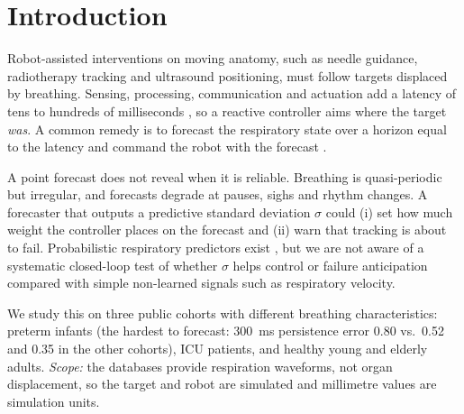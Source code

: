 \documentclass[conference]{IEEEtran}
\begin{document}
\section{Introduction}
Robot-assisted interventions on moving anatomy, such as needle guidance, radiotherapy tracking and ultrasound positioning, must follow targets displaced by breathing. Sensing, processing, communication and actuation add a latency of tens to hundreds of milliseconds \cite{rCyber}, so a reactive controller aims where the target \emph{was}. A common remedy is to forecast the respiratory state over a horizon equal to the latency and command the robot with the forecast \cite{rArma,rGate,rSoft}.

A point forecast does not reveal when it is reliable. Breathing is quasi-periodic but irregular, and forecasts degrade at pauses, sighs and rhythm changes. A forecaster that outputs a predictive standard deviation $\sigma$ could (i) set how much weight the controller places on the forecast and (ii) warn that tracking is about to fail. Probabilistic respiratory predictors exist \cite{rProb}, but we are not aware of a systematic closed-loop test of whether $\sigma$ helps control or failure anticipation compared with simple non-learned signals such as respiratory velocity.

We study this on three public cohorts with different breathing characteristics: %
preterm infants (the hardest to forecast: 300~ms persistence error 0.80 vs.\ 0.52 and 0.35 in the other cohorts), ICU patients, and healthy young and elderly adults. \emph{Scope:} the databases provide respiration waveforms, not organ displacement, so the target and robot are simulated and millimetre values are simulation units.
\end{document}
